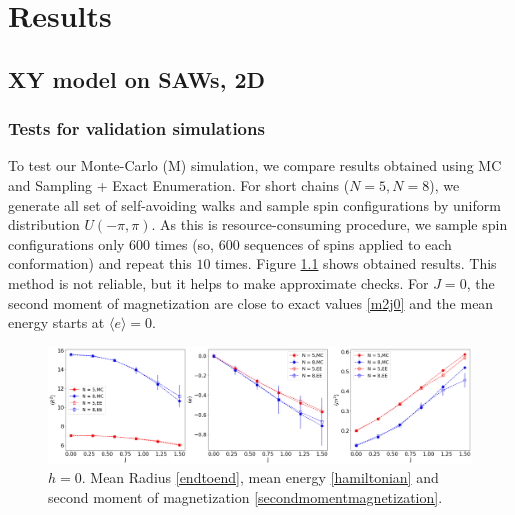 \chapter{Results} \label{ch:results}
\section{XY model on SAWs, 2D}
\subsection{Tests for validation simulations}
To test our Monte-Carlo (M) simulation, we compare results obtained using MC and Sampling + Exact Enumeration. For short chains ($N=5, N=8$), we generate all set of self-avoiding walks and sample spin configurations by uniform distribution $U(-\pi, \pi)$. As this is resource-consuming procedure, we sample spin configurations only $600$ times (so, 600 sequences of spins applied to each conformation) and repeat this $10$ times. Figure \ref{fig:ee} shows obtained results. This method is not reliable, but it helps to make approximate checks. For $J=0$, the second moment of magnetization are close to exact values \eqref{m2j0} and the mean energy starts at $\langle e \rangle = 0$.

 \begin{figure}[H]
	\centering
	\includegraphics[scale=0.26]{Images/EE.png}
	\caption{$h=0$. Mean Radius \eqref{endtoend}, mean energy \eqref{hamiltonian} and   second moment of magnetization \eqref{secondmomentmagnetization}.   }
	\label{fig:ee}
\end{figure}


